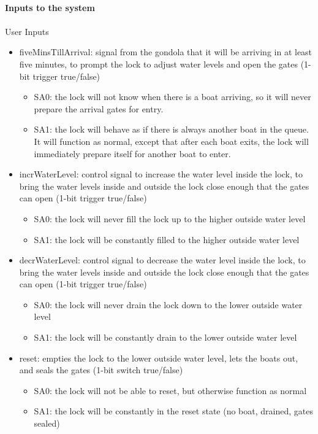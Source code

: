 \documentclass{article}
\begin{document}
      \paragraph{Inputs to the system}
      \paragraph{} User Inputs
      \begin{itemize}
        \item fiveMinsTillArrival: signal from the gondola that it will be arriving in at least five minutes, to prompt the lock to adjust water levels and open the gates (1-bit trigger true/false)
        \begin{itemize}
          \item SA0: the lock will not know when there is a boat arriving, so it will never prepare the arrival gates for entry.
          \item SA1: the lock will behave as if there is always another boat in the queue. It will function as normal, except that after each boat exits, the lock will immediately prepare itself for another boat to enter.
        \end{itemize}

        \item incrWaterLevel: control signal to increase the water level inside the lock, to bring the water levels inside and outside the lock close enough that the gates can open (1-bit trigger true/false)
        \begin{itemize}
          \item SA0: the lock will never fill the lock up to the higher outside water level
          \item SA1: the lock will be constantly filled to the higher outside water level
        \end{itemize}

        \item decrWaterLevel: control signal to decrease the water level inside the lock, to bring the water levels inside and outside the lock close enough that the gates can open (1-bit trigger true/false)
        \begin{itemize}
          \item SA0: the lock will never drain the lock down to the lower outside water level
          \item SA1: the lock will be constantly drain to the lower outside water level
        \end{itemize}

        \item reset: empties the lock to the lower outside water level, lets the boats out, and seals the gates (1-bit switch true/false)
        \begin{itemize}
          \item SA0: the lock will not be able to reset, but otherwise function as normal
          \item SA1: the lock will be constantly in the reset state (no boat, drained, gates sealed)
        \end{itemize}
      \end{itemize}
\end{document}
